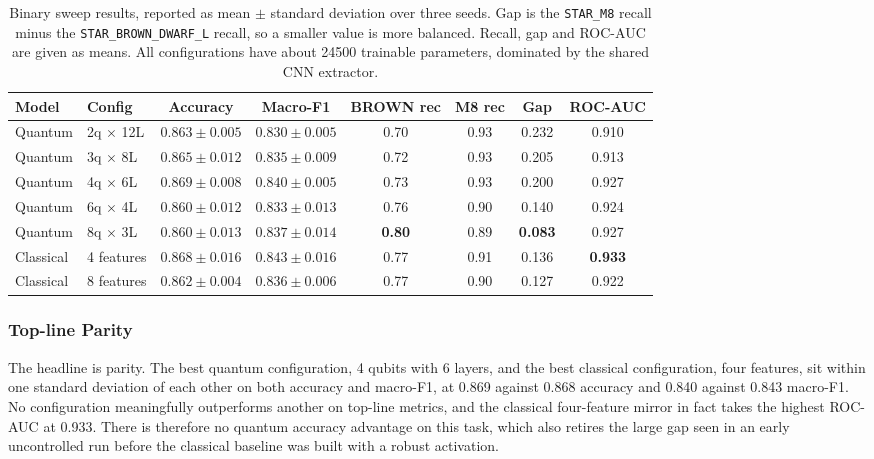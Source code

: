 \begin{table}[t]
    \centering
    \caption{Binary sweep results, reported as mean $\pm$ standard deviation over three
        seeds. Gap is the \texttt{STAR\_M8} recall minus the \texttt{STAR\_BROWN\_DWARF\_L}
        recall, so a smaller value is more balanced. Recall, gap and ROC-AUC are given as
        means. All configurations have about 24500 trainable parameters, dominated by the
        shared CNN extractor.}
    \label{tab:exp1_sweep}
    \footnotesize
    \setlength{\tabcolsep}{5pt}
    \begin{tabular}{llcccccc}
        \toprule
        Model     & Config          & Accuracy                 & Macro-F1                 & BROWN rec     & M8 rec & Gap            & ROC-AUC        \\
        \midrule
        Quantum   & 2q $\times$ 12L & $0.863\pm0.005$          & $0.830\pm0.005$          & 0.70          & 0.93   & 0.232          & 0.910          \\
        Quantum   & 3q $\times$ 8L  & $0.865\pm0.012$          & $0.835\pm0.009$          & 0.72          & 0.93   & 0.205          & 0.913          \\
        Quantum   & 4q $\times$ 6L  & $\mathbf{0.869\pm0.008}$ & $0.840\pm0.005$          & 0.73          & 0.93   & 0.200          & 0.927          \\
        Quantum   & 6q $\times$ 4L  & $0.860\pm0.012$          & $0.833\pm0.013$          & 0.76          & 0.90   & 0.140          & 0.924          \\
        Quantum   & 8q $\times$ 3L  & $0.860\pm0.013$          & $0.837\pm0.014$          & \textbf{0.80} & 0.89   & \textbf{0.083} & 0.927          \\
        Classical & 4 features      & $0.868\pm0.016$          & $\mathbf{0.843\pm0.016}$ & 0.77          & 0.91   & 0.136          & \textbf{0.933} \\
        Classical & 8 features      & $0.862\pm0.004$          & $0.836\pm0.006$          & 0.77          & 0.90   & 0.127          & 0.922          \\
        \bottomrule
    \end{tabular}
\end{table}

\subsubsection{Top-line Parity}

The headline is parity. The best quantum configuration, 4 qubits with 6 layers, and
the best classical configuration, four features, sit within one standard deviation
of each other on both accuracy and macro-F1, at 0.869 against 0.868 accuracy and
0.840 against 0.843 macro-F1. No configuration meaningfully outperforms another on
top-line metrics, and the classical four-feature mirror in fact takes the highest
ROC-AUC at 0.933. There is therefore no quantum accuracy advantage on this task,
which also retires the large gap seen in an early uncontrolled run before the
classical baseline was built with a robust activation.

